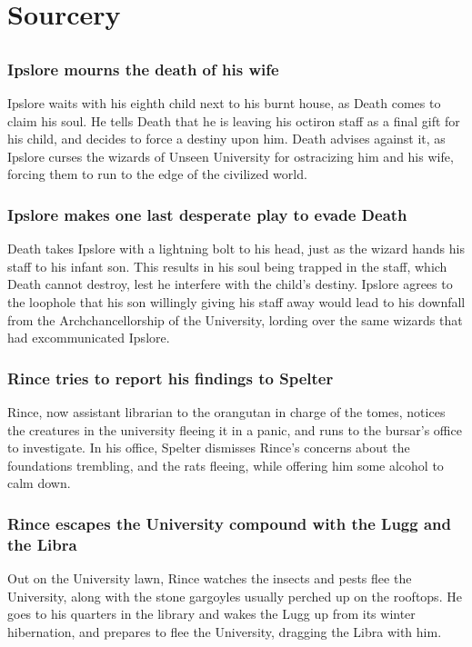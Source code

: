 \section{Sourcery}


\subsection{}
\subsubsection{\Gls{Ipslore} mourns the death of his wife}
\Gls{Ipslore} waits with his eighth child next to his burnt house, as \Gls{Death} comes to claim
his soul. He tells \Gls{Death} that he is leaving his octiron staff as a final gift for his
child, and decides to force a destiny upon him. \Gls{Death} advises against it, as \Gls{Ipslore}
curses the wizards of Unseen University for ostracizing him and his wife, forcing them to run to
the edge of the civilized world.

\subsubsection{\Gls{Ipslore} makes one last desperate play to evade \Gls{Death}}
\Gls{Death} takes \Gls{Ipslore} with a lightning bolt to his head, just as the wizard hands his
staff to his infant son. This results in his soul being trapped in the staff, which \Gls{Death}
cannot destroy, lest he interfere with the child's destiny. \Gls{Ipslore} agrees to the loophole
that his son willingly giving his staff away would lead to his downfall from the Archchancellorship
of the University, lording over the same wizards that had excommunicated \Gls{Ipslore}.

\subsubsection{\Gls{Rince} tries to report his findings to \Gls{Spelter}}
\Gls{Rince}, now assistant librarian to the orangutan in charge of the tomes, notices the
creatures in the university fleeing it in a panic, and runs to the bursar's office to investigate.
In his office, \Gls{Spelter} dismisses \Gls{Rince}'s concerns about the foundations trembling, and
the rats fleeing, while offering him some alcohol to calm down.

\subsubsection{\Gls{Rince} escapes the University compound with the \Gls{Lugg} and the \Gls{Libra}}
Out on the University lawn, \Gls{Rince} watches the insects and pests flee the University, along
with the stone gargoyles usually perched up on the rooftops. He goes to his quarters in the library
and wakes the \Gls{Lugg} up from its winter hibernation, and prepares to flee the University,
dragging the \Gls{Libra} with him.

